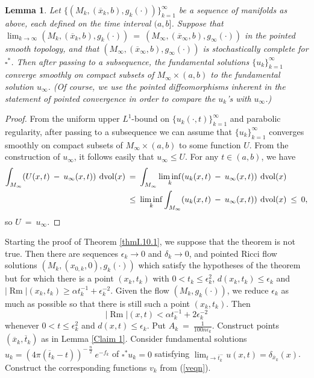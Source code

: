 \documentclass[12pt]{amsart}
\newcommand{\dvol}{\operatorname{dvol}}
\newcommand{\Rm}{\operatorname{Rm}}
\numberwithin{equation}{section}
\theoremstyle{plain}
\newtheorem{lemma}[equation]{Lemma}
\theoremstyle{definition}
\theoremstyle{remark}
\begin{document}
\begin{lemma} \label{stoccomplete}
Let $\{(M_k, (\overline{x}_k, b), g_k(\cdot)) \}_{k=1}^\infty$ be a 
sequence of 
manifolds as above, 
each defined on the time interval
$(a,b]$. 
Suppose that $\lim_{k \rightarrow \infty}
(M_k, (\overline{x}_k, b), g_k(\cdot)) \: = \: 
(M_\infty, (\overline{x}_\infty, b), g_\infty(\cdot))$ 
in the pointed smooth topology, and that 
$(M_\infty, (\overline{x}_\infty, b), g_\infty(\cdot))$
is stochastically complete for $\square^*$.  
Then after passing to a subsequence,
the fundamental solutions $\{ u_k \}_{k=1}^\infty$ converge smoothly
on compact subsets of $M_\infty \times (a,b)$ to the fundamental
solution $u_\infty$.
(Of course, we use the
pointed diffeomorphisms inherent in the statement of pointed convergence
in order to compare the $u_k$'s with $u_\infty$.)
\end{lemma}
\begin{proof}
From the uniform upper $L^1$-bound on $\{ u_k(\cdot, t) \}_{k=1}^\infty$ 
and parabolic
regularity, after passing to a subsequence we can assume that
$\{ u_k\}_{k=1}^\infty$ converges smoothly on compact subsets of
$M_\infty \times (a,b)$ to some function $U$. From the construction of
$u_\infty$, it follows easily that $u_\infty \le U$. For any
$t \in (a,b)$, we have
\begin{align}
\int_{M_\infty} ( U(x,t) \: - \: u_\infty(x,t) ) \: \dvol(x) \: & = \:
\int_{M_\infty} \liminf_k ( u_k(x, t) \: - \: u_\infty(x,t) ) \: \dvol(x) \\
& \le \: \liminf_k \int_{M_\infty} ( u_k(x, t) \: - \: u_\infty(x,t) ) \: 
\dvol(x) \: \le \: 0, \notag
\end{align}
so $U \: = \: u_\infty$.
\end{proof}


Starting the proof of Theorem \ref{thmI.10.1}, we suppose that the
theorem is not true. Then there are
sequences $\epsilon_k \rightarrow 0$ and
$\delta_k \rightarrow 0$, and
pointed Ricci flow solutions $(M_k, (x_{0,k}, 0), g_k(\cdot))$
which
satisfy the hypotheses of the theorem but for which there is a point
$(x_k, t_k)$ with $0 < t_k \le \epsilon_k^2$, 
$d(x_k, t_k) \le \epsilon_k$
and 
$|\Rm|(x_k, t_k) \geq \alpha t_k^{-1} + \epsilon_k^{-2}$.
Given the flow $(M_k, g_k(\cdot))$, we reduce $\epsilon_k$ as much as
possible so that there is still such a point $(x_k, t_k)$. Then
\begin{equation} \label{largebound}
|\Rm|(x, t) < \alpha t_k^{-1} + 2\epsilon_k^{-2}
\end{equation}
whenever
$0 < t \le \epsilon_k^2$ and 
$d(x, t) \le \epsilon_k$.
Put $A_k \: = \: \frac{1}{100n\epsilon_k}$. Construct points
$(\overline{x}_k, \overline{t}_k)$ as in Lemma \ref{Claim 1}.
Consider fundamental
solutions $u_k = (4\pi(\overline{t}_k - t))^{- \: \frac{n}{2}} \: 
e^{-f_k}$ of $\square^* u_k = 0$ satisfying 
$\lim_{t \rightarrow \overline{t}_k^-} u(x, t) = \delta_{\overline{x}_k}(x)$.
Construct the corresponding functions
$v_k$ from (\ref{veqn}).
\end{document}
